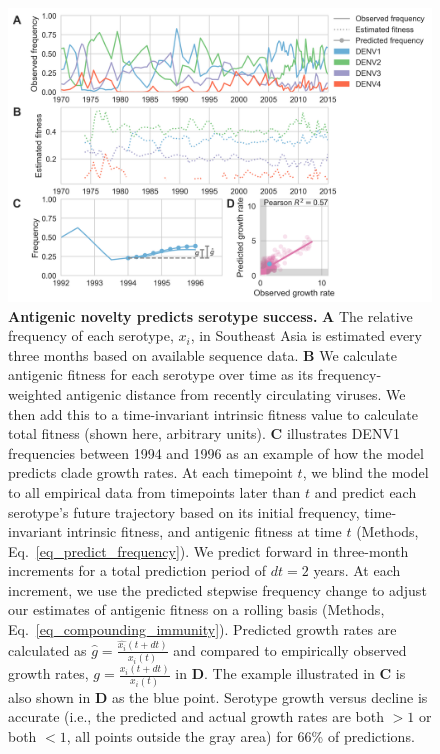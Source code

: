 \documentclass[11pt,oneside,letterpaper]{article}
\begin{document}
\begin{figure}[ht]
  \begin{centering}
    \includegraphics[width=\linewidth]{../figures/png/serotype_fitness_model.png}
  	\caption{\textbf{Antigenic novelty predicts serotype success.}
    \textbf{A} The relative frequency of each serotype, $x_i$, in Southeast Asia is estimated every three months based on available sequence data.
    \textbf{B} We calculate antigenic fitness for each serotype over time as its frequency-weighted antigenic distance from recently circulating viruses.
    We then add this to a time-invariant intrinsic fitness value to calculate total fitness (shown here, arbitrary units).
    \textbf{C} illustrates DENV1 frequencies between 1994 and 1996 as an example of how the model predicts clade growth rates.
    At each timepoint $t$, we blind the model to all empirical data from timepoints later than $t$ and predict each serotype's future trajectory based on its initial frequency, time-invariant intrinsic fitness, and antigenic fitness at time $t$ (Methods, Eq.~\ref{eq_predict_frequency}).
    We predict forward in three-month increments for a total prediction period of $dt = 2$ years.
    At each increment, we use the predicted stepwise frequency change to adjust our estimates of antigenic fitness on a rolling basis (Methods, Eq.~\ref{eq_compounding_immunity}).
    Predicted growth rates are calculated as $\hat{g} = \frac{\hat{x_i}(t+dt)}{x_i(t)}$ and compared to empirically observed growth rates, $g = \frac{x_i(t+dt)}{x_i(t)}$ in \textbf{D}.
    The example illustrated in \textbf{C} is also shown in \textbf{D} as the blue point.
    Serotype growth versus decline is accurate (i.e., the predicted and actual growth rates are both $>1$ or both $<1$, all points outside the gray area) for 66\% of predictions.
    }
  	\label{serotype_fitness_model}
  \end{centering}
\end{figure}
\end{document}
